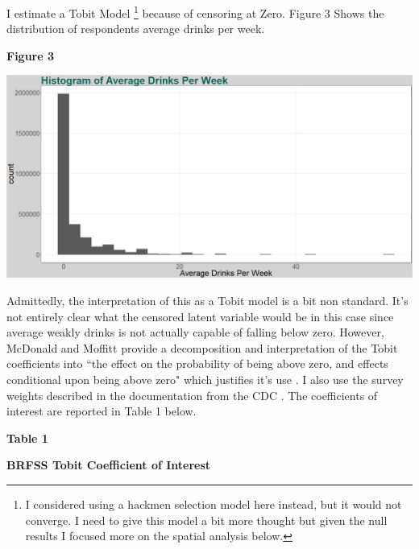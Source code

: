 \documentclass[11pt]{article}
\begin{document}
I estimate a Tobit Model  \footnote{I considered using a hackmen selection model here instead, but it would not converge. I need to give this model a bit more thought but given the null results I focused more on the spatial analysis below.} because of censoring at Zero. Figure 3 Shows the distribution of respondents average drinks per week. 

\begin{center}
	
	\centering
	\textbf{Figure 3}\par\medskip
	\includegraphics[width=1\linewidth]{Hist_nm_aved_week.png}
\end{center}

Admittedly, the interpretation of this as a Tobit model is a bit non standard. It's not entirely clear what the censored latent variable would be in this case since average weakly drinks is not actually capable of falling below zero. However, McDonald and Moffitt provide a decomposition and interpretation of the Tobit coefficients into ``the effect on the probability of being above zero, and effects conditional upon being above zero" which justifies it's use \cite{Mcdon_moffit}. I also use the survey weights described in the documentation from the CDC \cite{BRFSS_weights}. The coefficients of interest are reported in Table 1 below. 


\begin{center}
	
	\centering
		\LARGE{\textbf{Table 1}}\par\medskip
		
	\normalsize{\textbf{BRFSS Tobit Coefficient of Interest}}\par\medskip
	\scalebox{1}{
		
	}
\end{center}
\end{document}
